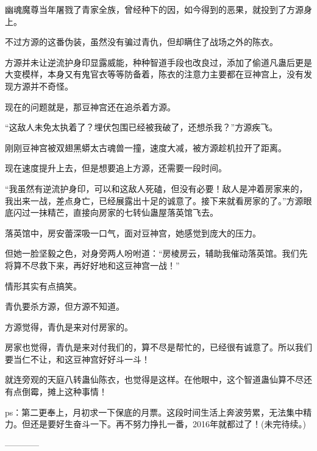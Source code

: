 \begin{this_body}
幽魂魔尊当年屠戮了青家全族，曾经种下的因，如今得到的恶果，就投到了方源身上。

不过方源的这番伪装，虽然没有骗过青仇，但却瞒住了战场之外的陈衣。

方源并未让逆流护身印显露威能，种种智道手段也改良过，添加了偷道凡蛊后更是大变模样，本身又有鬼官衣等等防备着，陈衣的注意力主要都在豆神宫上，没有发现方源并不奇怪。

现在的问题就是，那豆神宫还在追杀着方源。

“这敌人未免太执着了？埋伏包围已经被我破了，还想杀我？”方源疾飞。

刚刚豆神宫被双翅黑蟒太古魂兽一撞，速度大减，被方源趁机拉开了距离。

现在速度提升上去，但是想要追上方源，还需要一段时间。

“我虽然有逆流护身印，可以和这敌人死磕，但没有必要！敌人是冲着房家来的，我出来一战，差点身亡，已经展露出十足的诚意了。接下来就看房家的了。”方源眼底闪过一抹精芒，直接向房家的七转仙蛊屋落英馆飞去。

落英馆中，房安蕾深吸一口气，面对豆神宫，她感觉到庞大的压力。

但她一脸坚毅之色，对身旁两人吩咐道：“房棱房云，辅助我催动落英馆。我们先将算不尽救下来，再好好地和这豆神宫一战！”

情形其实有点搞笑。

青仇要杀方源，但方源不知道。

方源觉得，青仇是来对付房家的。

房家也觉得，青仇是来对付我们的，算不尽是帮忙的，已经很有诚意了。所以我们要当仁不让，和这豆神宫好好斗一斗！

就连旁观的天庭八转蛊仙陈衣，也觉得是这样。在他眼中，这个智道蛊仙算不尽还有点倒霉，摊上这种事情！

ps：第二更奉上，月初求一下保底的月票。这段时间生活上奔波劳累，无法集中精力。但还是要好生奋斗一下。再不努力挣扎一番，2016年就都过了！(未完待续。)

------------

\end{this_body}

